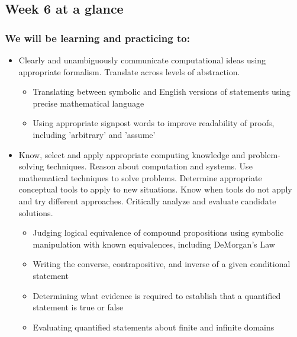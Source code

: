 

\subsection*{Week 6 at a glance}

\subsubsection*{We will be learning and practicing to:}
\begin{itemize}

\item Clearly and unambiguously communicate computational ideas using appropriate formalism. Translate across levels of abstraction.
\begin{itemize}
   \item Translating between symbolic and English versions of statements using precise mathematical language
    \item Using appropriate signpost words to improve readability of proofs, including 'arbitrary' and 'assume'
\end{itemize}

\item Know, select and apply appropriate computing knowledge and problem-solving techniques. Reason about computation and systems. Use mathematical techniques to solve problems. Determine appropriate conceptual tools to apply to new situations. Know when tools do not apply and try different approaches. Critically analyze and evaluate candidate solutions.
\begin{itemize}
    \item Judging logical equivalence of compound propositions using symbolic manipulation with known equivalences, including DeMorgan's Law
    \item Writing the converse, contrapositive, and inverse of a given conditional statement
    \item Determining what evidence is required to establish that a quantified statement is true or false
    \item Evaluating quantified statements about finite and infinite domains
\end{itemize}


\end{itemize}
